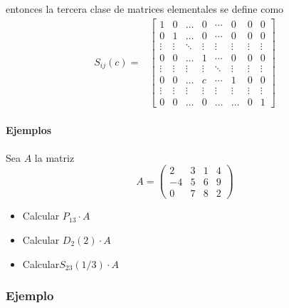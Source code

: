 \documentclass[
]{article}
\begin{document}
entonces la tercera clase de matrices elementales se define como
\begin{equation*}
\begin{array}{cc}
S_{ij}(c) = &  \begin{bmatrix} 
                   1      & 0     & \ldots  & 0     & \cdots& 0      & 0       & 0      \\ 
                   0      & 1     & \ldots  & 0     & \cdots& 0      & 0       & 0      \\
                \vdots    & \vdots& \ddots  & \vdots& \vdots& \vdots & \vdots  & \vdots \\
                   0      &  0    & \ldots  & 1     & \cdots& 0      & 0       & 0      \\
                \vdots    & \vdots& \vdots  & \vdots& \ddots& \vdots& \vdots  & \vdots \\
                   0      &  0    & \ldots  & c     & \cdots& 1      & 0       & 0      \\
                \vdots    & \vdots& \vdots  & \vdots& \vdots& \vdots & \vdots  & \vdots \\   
                  0       &  0    & \ldots  & 0     & \ldots& \ldots & 0      & 1
              \end{bmatrix}
\end{array}
\end{equation*}

\hypertarget{ejemplos}{%
\paragraph{Ejemplos}\label{ejemplos}}

Sea \(A\) la matriz \[
A=\begin{pmatrix}
      2 & 3 & 1 & 4 \\
     -4 & 5 & 6 & 9 \\
      0 & 7 & 8 & 2 
  \end{pmatrix}
\]

\begin{itemize}
\item
  Calcular \(P_{13}\cdot A\)
\item
  Calcular \(D_2(2)\cdot A\)
\item
  Calcular\(S_{23}(1/3)\cdot A\)
\end{itemize}

\hypertarget{ejemplo-6}{%
\subsubsection{Ejemplo}\label{ejemplo-6}}
\end{document}
